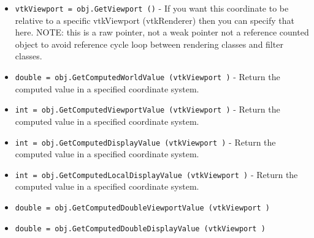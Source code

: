 \begin{itemize}
\item  \verb|vtkViewport = obj.GetViewport ()| -  If you want this coordinate to be relative to a specific
 vtkViewport (vtkRenderer) then you can specify
 that here.
 NOTE: this is a raw pointer, not a weak pointer not a reference counted
 object to avoid reference cycle loop between rendering classes and filter
 classes.

\item  \verb|double = obj.GetComputedWorldValue (vtkViewport )| -  Return the computed value in a specified coordinate system.

\item  \verb|int = obj.GetComputedViewportValue (vtkViewport )| -  Return the computed value in a specified coordinate system.

\item  \verb|int = obj.GetComputedDisplayValue (vtkViewport )| -  Return the computed value in a specified coordinate system.

\item  \verb|int = obj.GetComputedLocalDisplayValue (vtkViewport )| -  Return the computed value in a specified coordinate system.

\item  \verb|double = obj.GetComputedDoubleViewportValue (vtkViewport )|

\item  \verb|double = obj.GetComputedDoubleDisplayValue (vtkViewport )|

\end{itemize}
